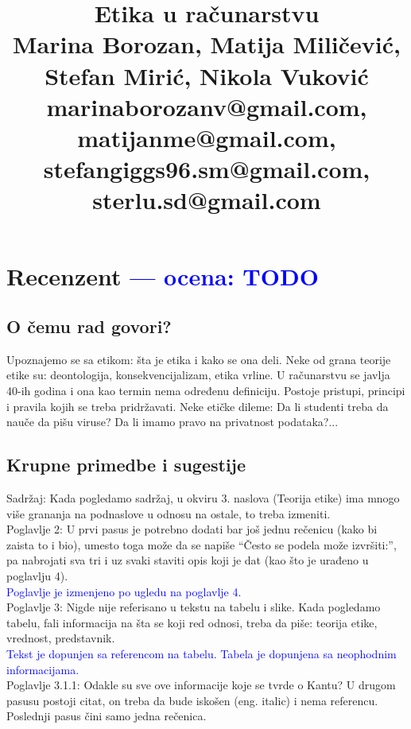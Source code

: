 \documentclass[a4paper]{report}
\newcommand{\odgovor}[1]{\textcolor{blue}{#1}}
\begin{document}
\title{Etika u računarstvu\\ \small{
	Marina Borozan, Matija Miličević,\\
	Stefan Mirić, Nikola Vuković\\
	marinaborozanv@gmail.com, matijanme@gmail.com,\\
	stefangiggs96.sm@gmail.com, sterlu.sd@gmail.com
}}

\maketitle

\tableofcontents

\chapter{Recenzent \odgovor{--- ocena: TODO} }


\section{O čemu rad govori?}
Upoznajemo se sa etikom: šta je etika i kako se ona deli. Neke od grana teorije etike su: deontologija, konsekvencijalizam, etika vrline. U računarstvu se javlja 40-ih godina i ona kao termin nema određenu definiciju. Postoje pristupi, principi i pravila kojih se treba pridržavati. Neke etičke dileme: Da li studenti treba da nauče da pišu viruse? Da li imamo pravo na privatnost podataka?...

\section{Krupne primedbe i sugestije}
\textbullet Sadržaj: Kada pogledamo sadržaj, u okviru 3. naslova (Teorija etike) ima mnogo više grananja na podnaslove u odnosu na ostale, to treba izmeniti.
\\\textbullet Poglavlje 2: U prvi pasus je potrebno dodati bar još jednu rečenicu (kako bi zaista to i bio), umesto toga može da se napiše “Često se podela može izvršiti:”, pa nabrojati sva tri i uz svaki staviti opis koji je dat (kao što je urađeno u poglavlju 4). 
\\\odgovor{Poglavlje je izmenjeno po ugledu na poglavlje 4.}
\\\textbullet Poglavlje 3: Nigde nije referisano u tekstu na tabelu i slike. Kada pogledamo tabelu, fali informacija na šta se koji red odnosi, treba da piše: teorija etike, vrednost, predstavnik. 
\\\odgovor{Tekst je dopunjen sa referencom na tabelu. Tabela je dopunjena sa neophodnim informacijama. }
\\\textbullet Poglavlje 3.1.1: Odakle su sve ove informacije koje se tvrde o Kantu? U drugom pasusu postoji citat, on treba da bude iskošen (eng. italic) i nema referencu. Poslednji pasus čini samo jedna rečenica.
\end{document}
